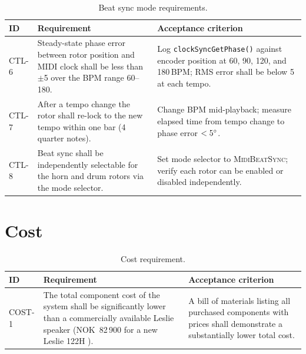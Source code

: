 \begin{table}[H]
	\centering
	\begin{tabular}{p{1.2cm} p{5.5cm} p{6cm}}
		\toprule
		\textbf{ID} & \textbf{Requirement}                                                                                                          & \textbf{Acceptance criterion} \\
		\midrule
		CTL-6       & Steady-state phase error between rotor position and MIDI clock shall be less than $\pm$5\degree{} over the BPM range 60--180. &
		Log \texttt{clockSyncGetPhase()} against encoder position at 60, 90, 120, and 180\,BPM; RMS error shall be below 5\degree{} at each tempo.                                  \\[4pt]
		CTL-7       & After a tempo change the rotor shall re-lock to the new tempo within one bar (4 quarter notes).                               &
		Change BPM mid-playback; measure elapsed time from tempo change to phase error $< 5\degree{}$.                                                                              \\[4pt]
		CTL-8       & Beat sync shall be independently selectable for the horn and drum rotors via the mode selector.                               &
		Set mode selector to \textsc{MidiBeatSync}; verify each rotor can be enabled or disabled independently.                                                                     \\
		\bottomrule
	\end{tabular}
	\caption{Beat sync mode requirements.}
	\label{tab:spec-beatsync}
\end{table}

\section{Cost}

\begin{table}[H]
	\centering
	\begin{tabular}{p{1.2cm} p{5.5cm} p{6cm}}
		\toprule
		\textbf{ID} & \textbf{Requirement}                                                                                                                                                             & \textbf{Acceptance criterion} \\
		\midrule
		COST-1      & The total component cost of the system shall be significantly lower than a commercially available Leslie speaker (NOK~82\,900 for a new Leslie 122H \citep{thomann_leslie122h}). &
		A bill of materials listing all purchased components with prices shall demonstrate a substantially lower total cost.                                                                                                           \\
		\bottomrule
	\end{tabular}
	\caption{Cost requirement.}
	\label{tab:spec-cost}
\end{table}

